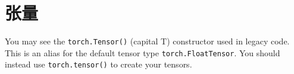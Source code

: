 \chapter{张量\label{Ch02}}
\begin{tcolorbox}[title=Note]
    You may see the \verb|torch.Tensor()| (capital T) constructor used in legacy code. This is an alias for the default tensor type \verb|torch.FloatTensor|. You should instead use \verb|torch.tensor()| to create your tensors.
\end{tcolorbox}